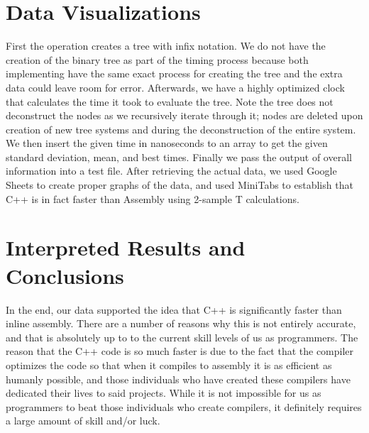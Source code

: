 \documentclass[a4paper,10pt]{article}
\begin{document}
\section*{Data Visualizations}
\smallskip
First the operation creates a tree with infix notation. We do not have the creation of the binary tree as part of the timing process because both implementing have the same exact process for creating the tree and the extra data could leave room for error. Afterwards, we have a highly optimized clock that calculates the time it took to evaluate the tree. Note the tree does not deconstruct the nodes as we recursively iterate through it; nodes are deleted upon creation of new tree systems and during the deconstruction of the entire system. We then insert the given time in nanoseconds to an array to get the given standard deviation, mean, and best times. Finally we pass the output of overall information into a test file. After retrieving the actual data, we used Google Sheets to create proper graphs of the data, and used MiniTabs to establish that C++ is in fact faster than Assembly using 2-sample T calculations. 

\section*{Interpreted Results and Conclusions}
\smallskip
In the end, our data supported the idea that C++ is significantly faster than inline assembly. There are a number of reasons why this is not entirely accurate, and that is absolutely up to to the current skill levels of us as programmers. The reason that the C++ code is so much faster is due to the fact that the compiler optimizes the code so that when it compiles to assembly it is as efficient as humanly possible, and those individuals who have created these compilers have dedicated their lives to said projects. While it is not impossible for us as programmers to beat those individuals who create compilers, it definitely requires a large amount of skill and/or luck. 
\end{document}
